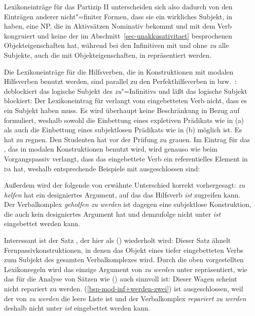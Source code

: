 {Lexikoneinträge für das Partizip II unterscheiden sich also dadurch von den Einträgen
anderer nicht"=finiter Formen, dass sie ein wirkliches Subjekt, in \subj haben, \dash eine NP, die in
Aktivsätzen Nominativ bekommt und mit dem Verb kongruiert und keine der im
Abschnitt~\ref{sec-unakkusativitaet} besprochenen Objekteigenschaften hat,
während bei den Infinitiven mit und ohne \emph{zu} alle Subjekte, \dash auch die mit
Objekteigenschaften, in \subj repräsentiert werden.

Die Lexikoneinträge für die Hilfsverben, die in Konstruktionen mit modalen Hilfsverben
benutzt werden, sind parallel zu den Perfekthilfsverben in  bzw.\ : 
\haben deblockiert das logische Subjekt des \emph{zu}"=Infinitivs und \sein läßt
das logische Subjekt blockiert: Der Lexikoneintrag für \haben verlangt vom eingebetteten
Verb nicht, dass es ein Subjekt haben muss. Es wird überhaupt keine Beschränkung in Bezug auf \subj
formuliert, weshalb sowohl die Einbettung eines expletiven Prädikats 
wie in (a) als auch die Einbettung eines subjektlosen Prädikats wie in (b) möglich ist.
\eal
\ex 
Es hat zu regnen.
\ex 
Den Studenten hat vor der Prüfung zu grauen.
\zl
Im Eintrag für das \sein, das in modalen Konstruktionen benutzt wird, wird genauso wie beim Vorgangspassiv
verlangt, dass das eingebettete Verb ein referentielles Element in \textsc{da} hat, weshalb
entsprechende Beispiele mit \sein ausgeschlossen sind:
\eal
{}
\zl

\noindent
Außerdem wird der folgende von \citet[]{Haider90b} erwähnte Unterschied 
korrekt vorhergesagt:
\eal
{}
\zl
\emph{zu helfen} hat ein designiertes Argument, auf das das Hilfsverb \emph{ist} zugreifen kann.
Der Verbalkomplex \emph{geholfen zu werden} ist dagegen eine subjektlose Konstruktion,
die auch kein designiertes Argument hat und demzufolge nicht unter \emph{ist} eingebettet
werden kann.

Interessant ist der Satz , der hier als () wiederholt wird:
\z
Dieser Satz ähnelt Fernpassivkonstruktionen, in denen das Objekt eines tiefer eingebetteten
Verbs zum Subjekt des gesamten Verbalkomplexes wird. Durch die oben vorgestellten Lexikonregeln
wird das einzige Argument von \emph{zu werden} unter \subj repräsentiert, wie das für
die Analyse von Sätzen wie () auch sinnvoll ist:
\ea
Dieser Wagen scheint nicht repariert zu werden.
\z
(\ref{bsp-mod-inf+werden-zwei}) ist ausgeschlossen, weil der \daw von \emph{zu werden} die
leere Liste ist und der Verbalkomplex \emph{repariert zu werden} deshalb nicht unter \emph{ist}
eingebettet werden kann.

}
